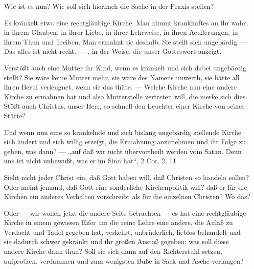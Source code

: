 Wie ist es nun? Wie soll sich hiernach die Sache in der Praxis stellen?

Es kränkelt etwa eine rechtgläubige Kirche. Man nimmt krankhaftes an ihr wahr, in ihrem Glauben, in ihrer Liebe, in ihrer Lehrweise, in ihren Aeußerungen, in ihrem Thun und Treiben. Man ermahnt sie deshalb. Sie stellt sich ungebärdig. — Das alles ist nicht recht. — , in der Weise, die unser Gotteswort anzeigt.

Verstößt auch eine Mutter ihr Kind, wenn es kränkelt und sich dabei ungebärdig stellt? Sie wäre keine Mutter mehr, sie wäre des Namens unwerth, sie hätte all ihren Beruf verleugnet, wenn sie das thäte. — Welche Kirche nun eine andere Kirche zu ermahnen hat und also Mutterstelle vertreten will, die merke sich dies. Stößt auch Christus, unser Herr, so schnell den Leuchter einer Kirche von seiner Stätte?

Und wenn nun eine so kränkelnde und sich bislang ungebärdig stellende Kirche sich ändert und sich willig erzeigt, die Ermahnung anzunehmen und ihr Folge zu geben, was dann?  — „auf daß wir nicht übervortheilt werden vom Satan. Denn uns ist nicht unbewußt, was er im Sinn hat“, 2 Cor. 2, 11.

Sieht nicht jeder Christ ein, daß Gott haben will, daß Christen so handeln sollen? Oder meint jemand, daß Gott eine sonderliche Kirchenpolitik will? daß er für die Kirchen ein anderes Verhalten vorschreibt als für die einzelnen Christen? Wo das?

Oder — wir wollen jetzt die andere Seite betrachten — es hat eine rechtgläubige Kirche in einem gewissen Eifer um die reine Lehre eine andere, die Anlaß zu Verdacht und Tadel gegeben hat, verkehrt, unbrüderlich, lieblos behandelt und sie dadurch schwer gekränkt und ihr großen Anstoß gegeben; was soll diese andere Kirche dann thun? Soll sie sich dann auf den Richterstuhl setzen, aufprotzen, verdammen und zum wenigsten Buße in Sack und Asche verlangen?

